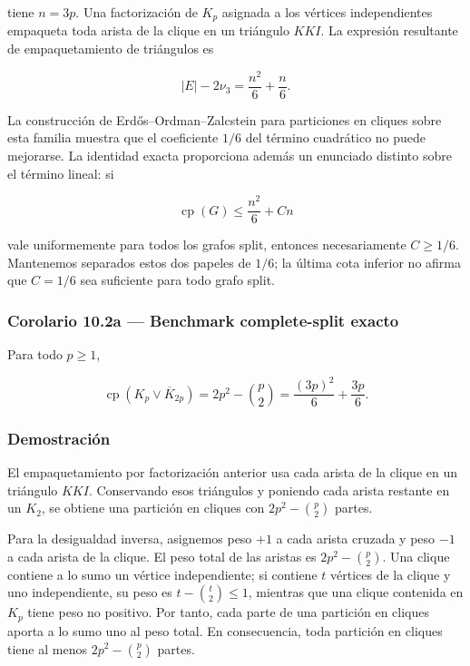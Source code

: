 \documentclass[spanish,11pt,a4paper]{article}
\begin{document}
tiene \(n=3p\). Una factorización de \(K_p\) asignada a los vértices
independientes empaqueta toda arista de la clique en un triángulo
\(KKI\). La expresión resultante de empaquetamiento de triángulos es

\[
|E|-2\nu_3
=
\frac{n^2}{6}+\frac n6.
\tag{10.1}
\]

La construcción de Erdős--Ordman--Zalcstein para particiones en cliques
sobre esta familia muestra que el coeficiente \(1/6\) del término
cuadrático no puede mejorarse. La identidad exacta proporciona además un
enunciado distinto sobre el término lineal: si

\[
\operatorname{cp}(G)\le \frac{n^2}{6}+Cn
\]

vale uniformemente para todos los grafos split, entonces necesariamente
\(C\ge1/6\). Mantenemos separados estos dos papeles de \(1/6\); la
última cota inferior no afirma que \(C=1/6\) sea suficiente para todo
grafo split.

\subsubsection{Corolario 10.2a --- Benchmark complete-split
exacto}\label{corolario-10.2a-benchmark-complete-split-exacto}

Para todo \(p\ge1\),

\[
\operatorname{cp}\!\left(K_p\vee\overline K_{2p}\right)
=
2p^2-\binom p2
=
\frac{(3p)^2}{6}+\frac{3p}{6}.
\tag{10.1a}
\]

\subsubsection{Demostración}\label{demostraciuxf3n-6}

El empaquetamiento por factorización anterior usa cada arista de la
clique en un triángulo \(KKI\). Conservando esos triángulos y poniendo
cada arista restante en un \(K_2\), se obtiene una partición en cliques
con \(2p^2-\binom p2\) partes.

Para la desigualdad inversa, asignemos peso \(+1\) a cada arista cruzada
y peso \(-1\) a cada arista de la clique. El peso total de las aristas
es \(2p^2-\binom p2\). Una clique contiene a lo sumo un vértice
independiente; si contiene \(t\) vértices de la clique y uno
independiente, su peso es \(t-\binom t2\le1\), mientras que una clique
contenida en \(K_p\) tiene peso no positivo. Por tanto, cada parte de
una partición en cliques aporta a lo sumo uno al peso total. En
consecuencia, toda partición en cliques tiene al menos
\(2p^2-\binom p2\) partes.
\end{document}
